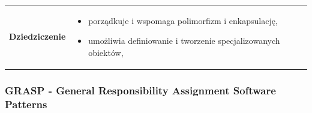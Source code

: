 \documentclass[a4paper]{article}
\begin{document}
\begin{table}[H]
\begin{center}
\begin{tabular}{  p{3cm} p{12cm}  }
                \textbf{Dziedziczenie}
                &
                \begin{itemize}
                    \item porządkuje i wspomaga polimorfizm i enkapsulację,
                    \item umożliwia definiowanie i tworzenie specjalizowanych obiektów,
                \end{itemize}
            \end{tabular}
        \end{center}
    \end{table}


    \subsubsection{GRASP - General Responsibility Assignment Software Patterns}
\end{document}
